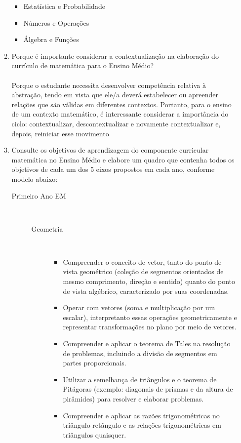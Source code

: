 \documentclass[a4paper, 12pt]{article}
\begin{document}
\begin{enumerate}
\begin{enumerate}
\begin{itemize}
    \item Estatística e Probabilidade
    \item Números e Operações
    \item Álgebra e Funções
    \end{itemize}
  \item Porque é importante considerar a contextualização na elaboração do currículo de matemática para o Ensino Médio?\\\\
    Porque o estudante necessita desenvolver competência relativa à abstração, tendo em vista que ele/a deverá estabelecer ou apreender relações que são válidas em diferentes contextos. Portanto, para o ensino de um contexto matemático, é interessante considerar a importância do ciclo: contextualizar, descontextualizar e novamente contextualizar e, depois, reiniciar esse movimento
  \item Consulte os objetivos de aprendizagem do componente curricular matemática no Ensino Médio e elabore um quadro que contenha todos os objetivos de cada um dos 5 eixos propostos em cada ano, conforme modelo abaixo:\\
    \begin{description}
    \item[Primeiro Ano EM]\ \\
      \begin{description}
      \item[Geometria]\ \\
        \begin{itemize}
        \item Compreender o conceito de vetor, tanto do ponto de vista geométrico (coleção de segmentos orientados de mesmo comprimento, direção e sentido) quanto do ponto de vista algébrico, caracterizado por suas coordenadas.
        \item Operar com vetores (soma e multiplicação por um escalar), interpretanto essas operações geometricamente e representar transformações no plano por meio de vetores.
        \item Compreender e aplicar o teorema de Tales na resolução de problemas, incluindo a divisão de segmentos em partes proporcionais.
        \item Utilizar a semelhança de triângulos e o teorema de Pitágoras (exemplo: diagonais de prismas e da altura de pirâmides) para resolver e elaborar problemas.
        \item Compreender e aplicar as razões trigonométricas no triângulo retângulo e as relações trigonométricas em triângulos quaisquer.

\end{itemize}
\end{description}
\end{description}
\end{enumerate}
\end{enumerate}
\end{document}
